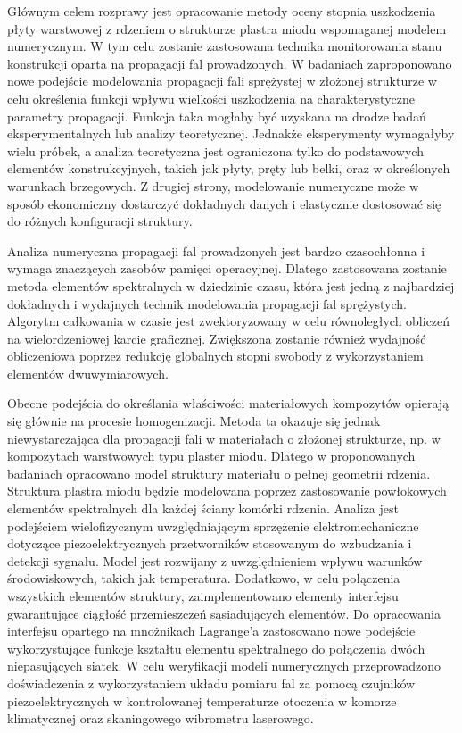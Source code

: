 {
Głównym celem rozprawy jest opracowanie metody oceny stopnia uszkodzenia płyty warstwowej z rdzeniem o strukturze plastra miodu wspomaganej modelem numerycznym.
W tym celu zostanie zastosowana technika monitorowania stanu konstrukcji oparta na propagacji fal prowadzonych.
W badaniach zaproponowano nowe podejście modelowania propagacji fali sprężystej w złożonej strukturze w celu określenia funkcji wpływu wielkości uszkodzenia na charakterystyczne parametry propagacji.
Funkcja taka mogłaby być uzyskana na drodze badań eksperymentalnych lub analizy teoretycznej.
Jednakże eksperymenty wymagałyby wielu próbek, a analiza teoretyczna jest ograniczona tylko do podstawowych elementów konstrukcyjnych, takich jak płyty, pręty lub belki, oraz w określonych warunkach brzegowych. 
Z drugiej strony, modelowanie numeryczne może w sposób ekonomiczny dostarczyć dokładnych danych i elastycznie dostosować się do różnych konfiguracji struktury.

Analiza numeryczna propagacji fal prowadzonych jest bardzo czasochłonna i wymaga znaczących zasobów pamięci operacyjnej.
Dlatego zastosowana zostanie metoda elementów spektralnych w dziedzinie czasu, która jest jedną z najbardziej dokładnych i wydajnych technik modelowania propagacji fal sprężystych.
Algorytm całkowania w czasie jest zwektoryzowany w celu równoległych obliczeń na wielordzeniowej karcie graficznej.
Zwiększona zostanie również wydajność obliczeniowa poprzez redukcję globalnych stopni swobody z wykorzystaniem elementów dwuwymiarowych.

Obecne podejścia do określania właściwości materiałowych kompozytów opierają się głównie na procesie homogenizacji.
Metoda ta okazuje się jednak niewystarczająca dla propagacji fali w materiałach o złożonej strukturze, np. w kompozytach warstwowych typu plaster miodu.
Dlatego w proponowanych badaniach opracowano model struktury materiału o pełnej geometrii rdzenia.
Struktura plastra miodu będzie modelowana poprzez zastosowanie powłokowych elementów spektralnych dla każdej ściany komórki rdzenia.
Analiza jest podejściem wielofizycznym uwzględniającym sprzężenie elektromechaniczne dotyczące piezoelektrycznych przetworników stosowanym do wzbudzania i detekcji sygnału. 
Model jest rozwijany z uwzględnieniem wpływu warunków środowiskowych, takich jak temperatura.
Dodatkowo, w celu połączenia wszystkich elementów struktury, zaimplementowano elementy interfejsu gwarantujące ciągłość przemieszczeń sąsiadujących elementów.
Do opracowania interfejsu opartego na mnożnikach Lagrange'a zastosowano nowe podejście wykorzystujące funkcje kształtu elementu spektralnego do połączenia dwóch niepasujących siatek.
W celu weryfikacji modeli numerycznych przeprowadzono doświadczenia z wykorzystaniem układu  pomiaru fal za pomocą czujników piezoelektrycznych w kontrolowanej temperaturze otoczenia w komorze klimatycznej oraz skaningowego wibrometru laserowego.

}
